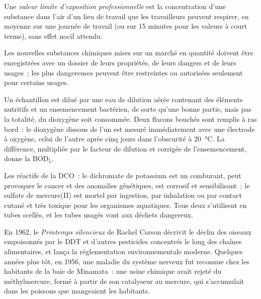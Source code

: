 \begin{definition}\label{def:b3:environmental-toxicology:oel}
Une \emph{valeur limite d'exposition professionnelle} est la
concentration d'une substance dans l'air d'un lieu de travail que les
travailleurs peuvent respirer, en moyenne sur une journée de travail (ou
sur 15 minutes pour les valeurs à court terme), sans effet nocif attendu.
\end{definition}

Les nouvelles substances chimiques mises sur un marché en quantité doivent
être enregistrées avec un dossier de leurs propriétés, de leurs dangers et
de leurs usages~; les plus dangereuses peuvent être restreintes ou
autorisées seulement pour certains usages.

\begin{inthelab}
Un échantillon est dilué par une eau de dilution aérée contenant des
éléments nutritifs et un ensemencement bactérien, de sorte qu'une bonne
partie, mais pas la totalité, du dioxygène soit consommée. Deux flacons
bouchés sont remplis à ras bord~: le dioxygène dissous de l'un est mesuré
immédiatement avec une électrode à oxygène, celui de l'autre après cinq
jours dans l'obscurité à
\qty{20}{\celsius}. La différence, multipliée par le facteur de dilution et corrigée de l'ensemencement, donne la
$\mathrm{BOD_5}$.
\end{inthelab}

\begin{safety}{}
Les réactifs de la DCO~: le dichromate de potassium est un comburant, peut
provoquer le cancer et des anomalies génétiques, est corrosif et
sensibilisant~; le sulfate de mercure(II) est mortel par ingestion, par
inhalation ou par contact cutané et très toxique pour les organismes
aquatiques. Tous deux s'utilisent en tubes scellés, et les tubes usagés
vont aux déchets dangereux.
\end{safety}

\begin{history}
En 1962, le \textit{Printemps silencieux} de Rachel Carson décrivit le déclin des oiseaux empoisonnés par
le DDT et d'autres pesticides concentrés le long des chaînes alimentaires,
et lança la réglementation environnementale moderne. Quelques années plus
tôt, en 1956, une maladie du système nerveux fut reconnue chez les
habitants de la baie de Minamata~: une usine chimique avait rejeté du
méthylmercure, formé à partir de son catalyseur au mercure, qui
s'accumulait dans les poissons que mangeaient les habitants.
\end{history}

